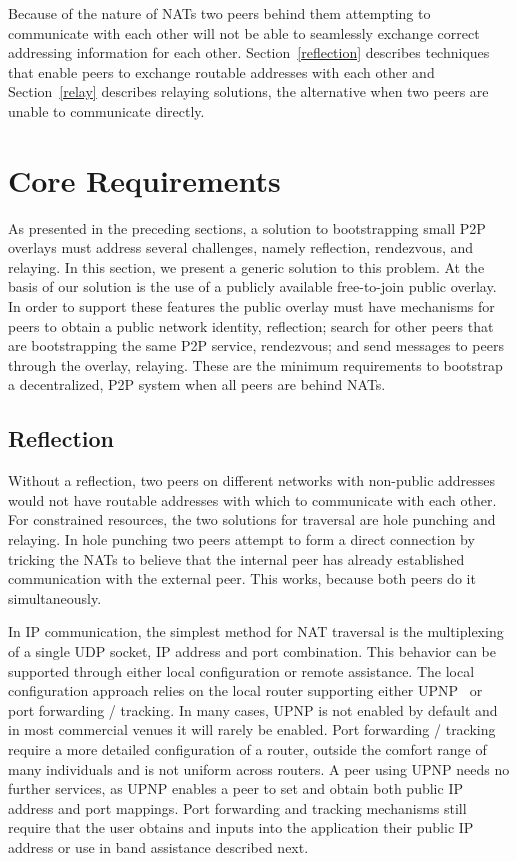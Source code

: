 \documentclass[conference]{IEEEtran}
\begin{document}
Because of the nature of NATs two peers behind them attempting to communicate
with each other will not be able to seamlessly exchange correct addressing
information for each other.  Section~\ref{reflection} describes techniques that
enable peers to exchange routable addresses with each other and
Section~\ref{relay} describes relaying solutions, the alternative when two
peers are unable to communicate directly.

\section{Core Requirements}
\label{overview}

As presented in the preceding sections, a solution to bootstrapping small P2P
overlays must address several challenges, namely reflection, rendezvous, and
relaying.  In this section, we present a generic solution to this problem.  At
the basis of our solution is the use of a publicly available free-to-join
public overlay.  In order to support these features the public overlay must
have mechanisms for peers to obtain a public network identity, reflection;
search for other peers that are bootstrapping the same P2P service, rendezvous;
and send messages to peers through the overlay, relaying.  These are the
minimum requirements to bootstrap a decentralized, P2P system when all peers
are behind NATs.

\subsection{Reflection}

Without a reflection, two peers on different networks with non-public addresses
would not have routable addresses with which to communicate with each other.
For constrained resources, the two solutions for traversal are hole punching
and relaying.  In hole punching two peers attempt to form a direct connection
by tricking the NATs to believe that the internal peer has already established
communication with the external peer.  This works, because both peers do it
simultaneously.

In IP communication, the simplest method for NAT traversal is the multiplexing
of a single UDP socket, IP address and port combination.  This behavior can be
supported through either local configuration or remote assistance.  The local
configuration approach relies on the local router supporting either
UPNP~\cite{upnp} or port forwarding / tracking.  In many cases, UPNP is not
enabled by default and in most commercial venues it will rarely be enabled.
Port forwarding / tracking require a more detailed configuration of a router,
outside the comfort range of many individuals and is not uniform across
routers.  A peer using UPNP needs no further services, as UPNP enables a peer
to set and obtain both public IP address and port mappings.  Port forwarding
and tracking mechanisms still require that the user obtains and inputs into the
application their public IP address or use in band assistance described next.
\end{document}
